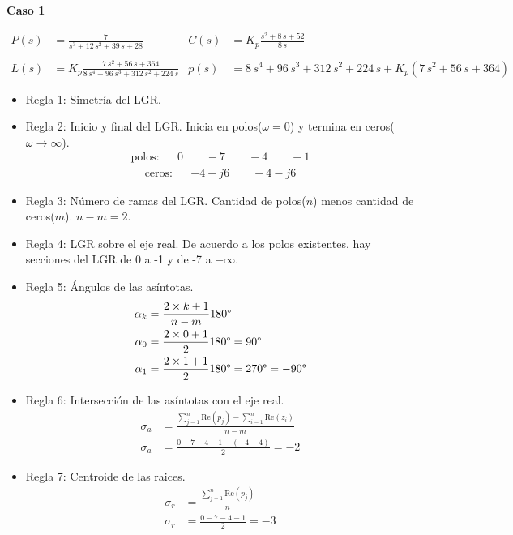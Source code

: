 \textbf{Caso 1}

\begin{align*}
  P(s) &= \frac{7}{s^3+12\,s^2+39\,s+28}
  &
  C(s) &= K_p\frac{s^2+8\,s+52}{8\,s}
  \\\\
  L(s) &= K_p\frac{7\,s^2+56\,s+364}{8\,s^4+96\,s^3+312\,s^2+224\,s}
  &
  p(s) &= 8\,s^4+96\,s^3+312\,s^2+224\,s + K_p(7\,s^2+56\,s+364)
\end{align*}

\begin{itemize}
  \item Regla 1: Simetría del LGR.
  \item Regla 2: Inicio y final del LGR. Inicia en polos($\omega = 0$) y termina en ceros($\omega \rightarrow \infty$).
  \begin{align*}
    \text{polos:} && 0 \qquad -7 \qquad -4 \qquad -1
  \end{align*}
  \begin{align*}
    \text{ceros:} && -4 + j6 \qquad -4 - j6
  \end{align*}
  \item Regla 3: Número de ramas del LGR. Cantidad de polos($n$) menos cantidad de ceros($m$). $n-m = 2$.
  \item Regla 4: LGR sobre el eje real. 
  De acuerdo a los polos existentes, hay secciones del LGR de 0 a -1 y de -7 a $-\infty$.
  \item Regla 5: Ángulos de las asíntotas.
  \begin{align*}
    \alpha_k &= \frac{2\times k + 1}{n-m}  180\degree
    \\
    \alpha_0 &= \frac{2\times0 + 1}{2}  180\degree = 90\degree
    \\
    \alpha_1 &= \frac{2\times1 + 1}{2}  180\degree = 270\degree =-90\degree  
  \end{align*}
  \item Regla 6: Intersección de las asíntotas con el eje real.
  \begin{align*}
    \sigma_a &= \frac{\sum_{j=1}^{n } \text{Re}(p_j) - \sum_{i=1}^{n } \text{Re}(z_i)}{n-m}
    \\
    \sigma_a &= \frac{0-7-4-1-(-4-4)}{2} = -2
  \end{align*}
  \item Regla 7: Centroide de las raices.
  \begin{align*}
    \sigma_r &= \frac{\sum_{j=1}^{n } \text{Re}(p_j)}{n}
    \\
    \sigma_r &= \frac{0-7-4-1}{2} = -3

\end{align*}
\end{itemize}
